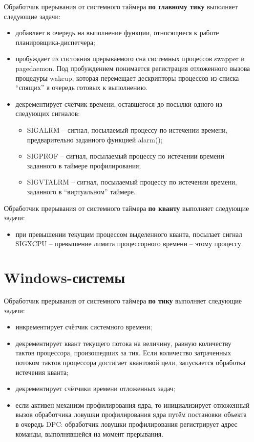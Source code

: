 Обработчик прерывания от системного таймера \textbf{по главному тику} выполняет следующие задачи:
\begin{itemize}
	\item добавляет в очередь на выполнение функции, относящиеся к работе планировщика-диспетчера;
	\item пробуждает из состояния прерываемого сна системных процессов {\ttfamily swapper} и {\ttfamily pagedaemon}.  Под пробуждением понимается регистрация отложенного вызова процедуры wakeup, которая перемещает дескрипторы
процессов из списка “спящих” в очередь готовых к выполнению.
	\item декрементирует счётчик времени, оставшегося до посылки одного из следующих сигналов:
	\begin{itemize}
		\item {\ttfamily SIGALRM} – сигнал, посылаемый процессу по истечении времени, предварительно заданного функцией {\ttfamily alarm()};
		\item {\ttfamily SIGPROF} –  сигнал, посылаемый процессу по истечении времени заданного в таймере профилирования;
		\item {\ttfamily SIGVTALRM} –  сигнал, посылаемый процессу по истечении времени, заданного в ``виртуальном'' таймере.
	\end{itemize}
\end{itemize}

Обработчик прерывания от системного таймера \textbf{по кванту} выполняет следующие задачи:
\begin{itemize}
	\item при превышении текущим процессом выделенного кванта, посылает сигнал {\ttfamily SIGXCPU} -- превышение лимита процессорного времени -- этому процессу.
\end{itemize}

\section{Windows-системы}

Обработчик прерывания от системного таймера \textbf{по тику} выполняет следующие задачи:
\begin{itemize}
	\item инкрементирует счётчик системного времени;
	\item декрементирует квант текущего потока на величину, равную количеству тактов процессора, произошедших за тик. Если количество затраченных потоком тактов процессора достигает квантовой цели, запускается обработка истечения кванта;
	\item декрементирует счётчики времени отложенных задач;
	\item если активен механизм профилирования ядра, то инициализирует отложенный вызов обработчика ловушки профилирования ядра путём постановки объекта в очередь {\ttfamily DPC}: обработчик ловушки профилирования регистрирует адрес команды, выполнявшейся на момент прерывания. 
\end{itemize}

